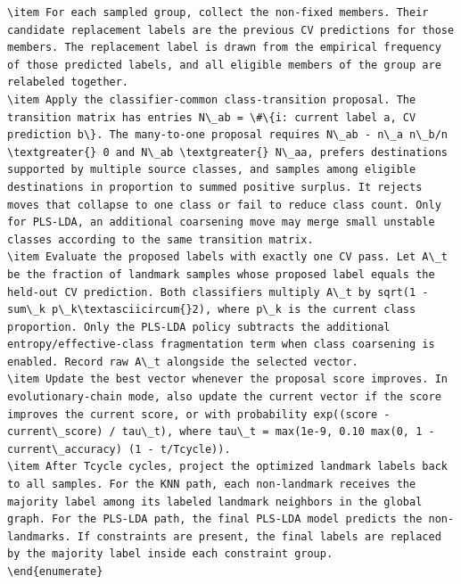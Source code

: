 \documentclass[twoside,11pt]{article}
\begin{document}
\begin{small}
\begin{verbatim}
\item For each sampled group, collect the non-fixed members. Their candidate replacement labels are the previous CV predictions for those members. The replacement label is drawn from the empirical frequency of those predicted labels, and all eligible members of the group are relabeled together.
\item Apply the classifier-common class-transition proposal. The transition matrix has entries N\_ab = \#\{i: current label a, CV prediction b\}. The many-to-one proposal requires N\_ab - n\_a n\_b/n \textgreater{} 0 and N\_ab \textgreater{} N\_aa, prefers destinations supported by multiple source classes, and samples among eligible destinations in proportion to summed positive surplus. It rejects moves that collapse to one class or fail to reduce class count. Only for PLS-LDA, an additional coarsening move may merge small unstable classes according to the same transition matrix.
\item Evaluate the proposed labels with exactly one CV pass. Let A\_t be the fraction of landmark samples whose proposed label equals the held-out CV prediction. Both classifiers multiply A\_t by sqrt(1 - sum\_k p\_k\textasciicircum{}2), where p\_k is the current class proportion. Only the PLS-LDA policy subtracts the additional entropy/effective-class fragmentation term when class coarsening is enabled. Record raw A\_t alongside the selected vector.
\item Update the best vector whenever the proposal score improves. In evolutionary-chain mode, also update the current vector if the score improves the current score, or with probability exp((score - current\_score) / tau\_t), where tau\_t = max(1e-9, 0.10 max(0, 1 - current\_accuracy) (1 - t/Tcycle)).
\item After Tcycle cycles, project the optimized landmark labels back to all samples. For the KNN path, each non-landmark receives the majority label among its labeled landmark neighbors in the global graph. For the PLS-LDA path, the final PLS-LDA model predicts the non-landmarks. If constraints are present, the final labels are replaced by the majority label inside each constraint group.
\end{enumerate}


\end{verbatim}
\end{small}
\end{document}
